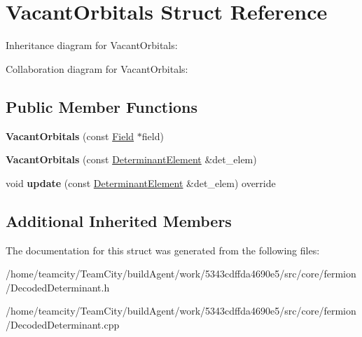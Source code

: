 \hypertarget{structVacantOrbitals}{}\section{Vacant\+Orbitals Struct Reference}
\label{structVacantOrbitals}


Inheritance diagram for Vacant\+Orbitals\+:


Collaboration diagram for Vacant\+Orbitals\+:
\subsection*{Public Member Functions}
\begin{DoxyCompactItemize}
\item 
{\bfseries Vacant\+Orbitals} (const \hyperlink{classField}{Field} $\ast$field)\hypertarget{structVacantOrbitals_abc2ee60690871c15227160b74329360e}{}\label{structVacantOrbitals_abc2ee60690871c15227160b74329360e}

\item 
{\bfseries Vacant\+Orbitals} (const \hyperlink{classDeterminantElement}{Determinant\+Element} \&det\+\_\+elem)\hypertarget{structVacantOrbitals_a4fd0fd14cc4f4c289027c0e58eb533ad}{}\label{structVacantOrbitals_a4fd0fd14cc4f4c289027c0e58eb533ad}

\item 
void {\bfseries update} (const \hyperlink{classDeterminantElement}{Determinant\+Element} \&det\+\_\+elem) override\hypertarget{structVacantOrbitals_a3c0f8eb12c0351379db87c93c615c96d}{}\label{structVacantOrbitals_a3c0f8eb12c0351379db87c93c615c96d}

\end{DoxyCompactItemize}
\subsection*{Additional Inherited Members}


The documentation for this struct was generated from the following files\+:\begin{DoxyCompactItemize}
\item 
/home/teamcity/\+Team\+City/build\+Agent/work/5343cdffda4690e5/src/core/fermion/Decoded\+Determinant.\+h\item 
/home/teamcity/\+Team\+City/build\+Agent/work/5343cdffda4690e5/src/core/fermion/Decoded\+Determinant.\+cpp\end{DoxyCompactItemize}
